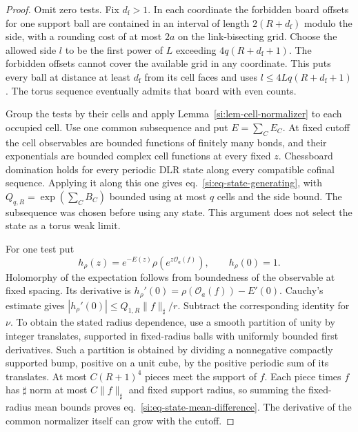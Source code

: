 \documentclass[11pt,letterpaper,reqno]{amsart}
\numberwithin{equation}{section}
\renewcommand{\eqref}[1]{\textup{eq.~\ref{#1}}}
\theoremstyle{definition}
\theoremstyle{remark}
\begin{document}
\begin{proof}
Omit zero tests. Fix $d_{\mathrm f}>1$. In each coordinate the
forbidden board offsets for one support ball are contained in an
interval of length $2(R+d_{\mathrm f})$ modulo the side, with a
rounding cost of at most $2a$ on the link-bisecting grid. Choose the
allowed side $l$ to be the first power of $L$ exceeding
$4q(R+d_{\mathrm f}+1)$. The forbidden offsets cannot cover the
available grid in any coordinate. This puts every ball at distance
at least $d_{\mathrm f}$ from its cell faces and uses
$l\le 4Lq(R+d_{\mathrm f}+1)$. The torus sequence eventually admits
that board with even counts.

Group the tests by their cells and apply
Lemma~\ref{si:lem-cell-normalizer} to each occupied cell. Use one
common subsequence and put $E=\sum_C E_C$. At fixed cutoff the
cell observables are bounded functions of finitely many bonds,
and their exponentials are bounded complex cell functions at
every fixed $z$. Chessboard domination holds for every periodic
DLR state along every compatible cofinal sequence. Applying it
along this one gives \eqref{si:eq-state-generating}, with
$Q_{q,R}=\exp(\sum_C B_C)$ bounded using at most $q$ cells and the
side bound. The subsequence was chosen before using any state.
This argument does not select the state as a torus weak limit.

For one test put
\[
 h_\rho(z)=e^{-E(z)}\rho(e^{z\mathcal O_a(f)}),\qquad h_\rho(0)=1.
\]
Holomorphy of the expectation follows from boundedness
of the observable at fixed spacing. Its derivative is
$h_\rho'(0)=\rho(\mathcal O_a(f))-E'(0)$.
Cauchy's estimate gives $|h_\rho'(0)|\le Q_{1,R}\|f\|_\sharp/r$.
Subtract the corresponding identity for $\nu$. To obtain the
stated radius dependence, use a smooth partition of unity by
integer translates, supported in fixed-radius balls with uniformly
bounded first derivatives. Such a partition is obtained by dividing
a nonnegative compactly supported bump, positive on a unit cube,
by the positive periodic sum of its translates. At most
$C(R+1)^4$ pieces meet the support of $f$. Each piece times $f$
has $\sharp$ norm at most $C\|f\|_\sharp$ and fixed support radius,
so summing the fixed-radius mean bounds proves
\eqref{si:eq-state-mean-difference}. The derivative of the common
normalizer itself can grow with the cutoff.
\end{proof}
\end{document}
